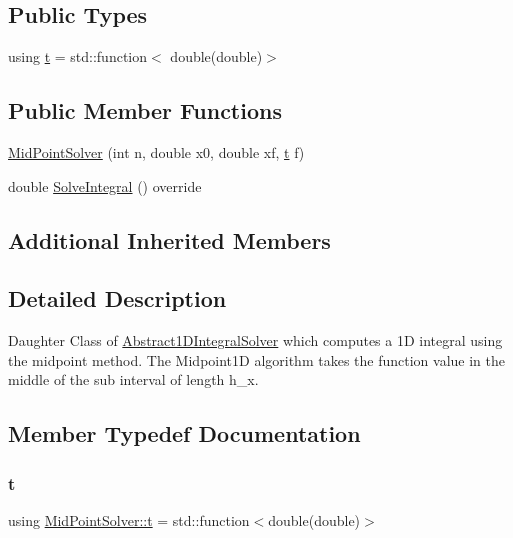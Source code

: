 \subsection*{Public Types}
\begin{DoxyCompactItemize}
\item 
using \hyperlink{class_mid_point_solver_a48db3b6c36d4edf214150e267c3d063c}{t} = std\+::function$<$ double(double)$>$
\end{DoxyCompactItemize}
\subsection*{Public Member Functions}
\begin{DoxyCompactItemize}
\item 
\hyperlink{class_mid_point_solver_afc0c085bfd86c3f17cb6dd0852ab7426}{Mid\+Point\+Solver} (int n, double x0, double xf, \hyperlink{class_mid_point_solver_a48db3b6c36d4edf214150e267c3d063c}{t} f)
\item 
double \hyperlink{class_mid_point_solver_a3e7224a0fb07b3ef7f5f9e7e577216cf}{Solve\+Integral} () override
\end{DoxyCompactItemize}
\subsection*{Additional Inherited Members}


\subsection{Detailed Description}
Daughter Class of \hyperlink{class_abstract1_d_integral_solver}{Abstract1\+D\+Integral\+Solver} which computes a 1D integral using the midpoint method. The Midpoint1D algorithm takes the function value in the middle of the sub interval of length h\+\_\+x. 

\subsection{Member Typedef Documentation}
\mbox{\label{class_mid_point_solver_a48db3b6c36d4edf214150e267c3d063c}} 
\subsubsection{\texorpdfstring{t}{t}}
{\footnotesize\ttfamily using \hyperlink{class_mid_point_solver_a48db3b6c36d4edf214150e267c3d063c}{Mid\+Point\+Solver\+::t} =  std\+::function$<$double(double)$>$}

